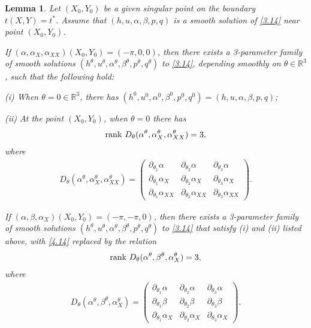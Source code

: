 \documentclass[11pt,reqno]{article}
\newtheorem{lem}{Lemma}
\newcommand{\pa}{\partial}
\numberwithin{equation}{section}
\begin{document}
\begin{lem}\label{lem4}
Let $(X_0,Y_0)$ be a given singular point on the boundary $t(X,Y)=t^*$. Assume that $(h, u, \alpha, \beta, p, q)$ is a smooth solution of \eqref{3.14} near point $(X_0,Y_0)$.

 If $(\alpha, \alpha_X, \alpha_{XX})(X_0, Y_0)=(-\pi, 0, 0)$, then there exists a 3-parameter family of smooth solutions $(h^\theta, u^\theta, \alpha^\theta, \beta^\theta, p^\theta, q^\theta)$ to \eqref{3.14}, depending smoothly on $\theta\in \mathbb{R}^3$, such that the following hold:

{\rm(i)} When $\theta=0\in\mathbb{R}^3$, there has $(h^0, u^0, \alpha^0, \beta^0, p^0, q^0)=(h, u, \alpha, \beta, p, q)$;

{\rm(ii)} At the point $(X_0, Y_0)$, when $\theta=0$ there has
\begin{align}\label{4.14}
{\rm rank}\ D_\theta(\alpha^\theta, \alpha_{X}^\theta, \alpha_{XX}^{\theta})=3,
\end{align}
where
\begin{align*}
D_\theta(\alpha^\theta, \alpha_{X}^\theta, \alpha_{XX}^{\theta})=
\left(
\begin{array}{ccc}
\pa_{\theta_1} \alpha  & \pa_{\theta_2} \alpha  & \pa_{\theta_3} \alpha \\
\pa_{\theta_1} \alpha_X  & \pa_{\theta_2} \alpha_X  & \pa_{\theta_3} \alpha_X \\
\pa_{\theta_1} \alpha_{XX}  & \pa_{\theta_2} \alpha_{XX}  & \pa_{\theta_3} \alpha_{XX}
\end{array}
\right).
\end{align*}

 If $(\alpha, \beta, \alpha_{X})(X_0, Y_0)=(-\pi, -\pi, 0)$, then there exists a 3-parameter family of smooth solutions $(h^\theta, u^\theta, \alpha^\theta, \beta^\theta, p^\theta, q^\theta)$ to \eqref{3.14}
that satisfy {\rm (i)} and {\rm (ii)} listed above, with \eqref{4.14} replaced by the relation
\begin{align}\label{4.15}
{\rm rank}\ D_\theta(\alpha^\theta, \beta^\theta, \alpha_{X}^{\theta})=3,
\end{align}
where
\begin{align*}
D_\theta(\alpha^\theta, \beta^\theta, \alpha_{X}^{\theta})=
\left(
\begin{array}{ccc}
\pa_{\theta_1} \alpha  & \pa_{\theta_2} \alpha  & \pa_{\theta_3} \alpha \\
\pa_{\theta_1} \beta  & \pa_{\theta_2} \beta  & \pa_{\theta_3} \beta \\
\pa_{\theta_1} \alpha_{X}  & \pa_{\theta_2} \alpha_{X}  & \pa_{\theta_3} \alpha_{X}
\end{array}
\right).
\end{align*}
\end{lem}
\end{document}
